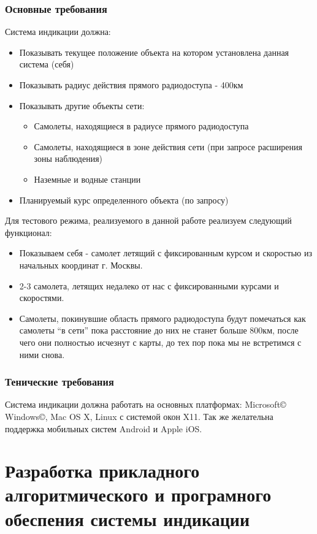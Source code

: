 \documentclass[a4paper,12pt]{report} %
\begin{document}
\subsection{Основные требования}
Система индикации должна:
\begin{itemize}
\item Показывать текущее положение объекта на котором установлена данная система
  (себя)
\item Показывать радиус действия прямого радиодоступа - 400км
\item Показывать другие объекты сети:
  \begin{itemize}
  \item Самолеты, находящиеся в радиусе прямого радиодоступа
  \item Самолеты, находящиеся в зоне действия сети (при запросе расширения зоны
    наблюдения)
  \item Наземные и водные станции
  \end{itemize}
\item Планируемый курс определенного объекта (по запросу)
\end{itemize}

Для тестового режима, реализуемого в данной работе реализуем следующий
функционал:
\begin{itemize}
\item Показываем себя - самолет летящий с фиксированным курсом и скоростью из
  начальных координат г. Москвы.
\item 2-3 самолета, летящих недалеко от нас с фиксированными курсами и
  скоростями.
\item Самолеты, покинувшие область прямого радиодоступа будут помечаться как
  самолеты ``в сети'' пока расстояние до них не станет больше 800км, после чего
  они полностью исчезнут с карты, до тех пор пока мы не встретимся с ними снова.
\end{itemize}

\subsection{Тенические требования}
Система индикации должна работать на основных платформах: Microsoft\copyright
Windows\copyright, Mac OS X, Linux с системой окон X11. Так же желательна
поддержка мобильных систем Android и Apple iOS.
\newpage

\chapter{Разработка прикладного алгоритмического и  програмного
  обеспения  системы индикации} %
\end{document}
